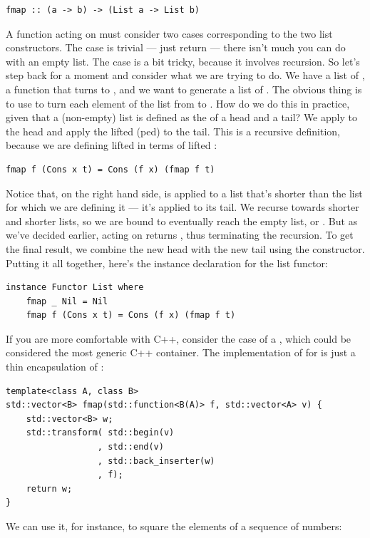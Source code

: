 \begin{Verbatim}
fmap :: (a -> b) -> (List a -> List b)
\end{Verbatim}
A function acting on  must consider two cases
corresponding to the two list constructors. The  case is
trivial --- just return  --- there isn't much you can do
with an empty list. The  case is a bit tricky, because it
involves recursion. So let's step back for a moment and consider what we
are trying to do. We have a list of , a function 
that turns  to , and we want to generate a list of
. The obvious thing is to use  to turn each element
of the list from  to . How do we do this in
practice, given that a (non-empty) list is defined as the 
of a head and a tail? We apply  to the head and apply the
lifted (ped)  to the tail. This is a recursive
definition, because we are defining lifted  in terms of lifted
:

\begin{Verbatim}
fmap f (Cons x t) = Cons (f x) (fmap f t)
\end{Verbatim}
Notice that, on the right hand side,  is applied to a
list that's shorter than the list for which we are defining it --- it's
applied to its tail. We recurse towards shorter and shorter lists, so we
are bound to eventually reach the empty list, or . But as
we've decided earlier,  acting on  returns
, thus terminating the recursion. To get the final result,
we combine the new head  with the new tail
 using the  constructor. Putting it
all together, here's the instance declaration for the list functor:

\begin{Verbatim}
instance Functor List where
    fmap _ Nil = Nil
    fmap f (Cons x t) = Cons (f x) (fmap f t)
\end{Verbatim}
If you are more comfortable with C++, consider the case of a
, which could be considered the most generic C++
container. The implementation of  for 
is just a thin encapsulation of :

\begin{Verbatim}
template<class A, class B>
std::vector<B> fmap(std::function<B(A)> f, std::vector<A> v) {
    std::vector<B> w;
    std::transform( std::begin(v)
                  , std::end(v)
                  , std::back_inserter(w)
                  , f); 
    return w;
}
\end{Verbatim}
We can use it, for instance, to square the elements of a sequence of
numbers:

